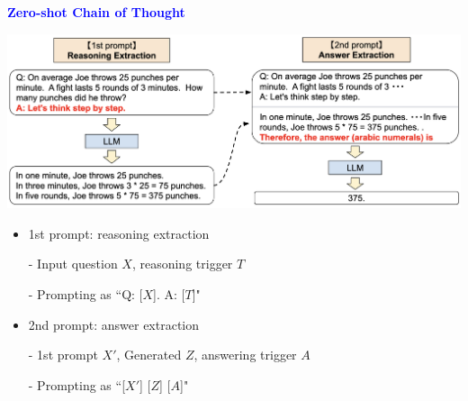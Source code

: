\documentclass[professionalfont]{beamer}
\begin{document}
\begin{frame}
\begin{center}
    { \textbf{\textcolor{blue}{ {\fontsize{12}{14}\selectfont Zero-shot Chain of Thought} }} }
\end{center}

\begin{center}
    \includegraphics[width=1.0\textwidth]{figure/2.png}
\end{center}

{\fontsize{10}{14}\selectfont 
\begin{itemize}
    \item 1st prompt: reasoning extraction
    
    - Input question \( X \), reasoning trigger \( T \)

    - Prompting as ``Q: [\( X \)]. A: [\( T \)]"

    \item 2nd prompt: answer extraction

    - 1st prompt \( X' \), Generated \( Z \), answering trigger \( A \)

    - Prompting as ``[\( X' \)] [\( Z \)] [\( A \)]"
    
\end{itemize}
}

\end{frame}
\end{document}
